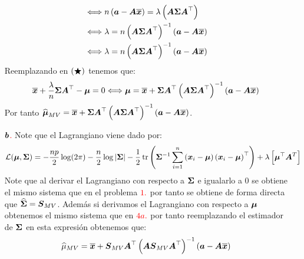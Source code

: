 \begin{itemize}
\begin{align*}
    &\ssi n\parcurvo{\bf{a} -\bf{A}
  \barra{\bf{x}}}=  \lambda\parcurvo{\bf{A}\bf{\Sigma}\bf{A}^\top}\\
    &\ssi \lambda = n\parcurvo{\bf{A}\bf{\Sigma}\bf{A}^\top}^{-1}\parcurvo{\bf{a} -\bf{A}
  \barra{\bf{x}}}\\
  &\ssi \lambda = n\parcurvo{\bf{A}\bf{\Sigma}\bf{A}^\top}^{-1}\parcurvo{\bf{a} -\bf{A}
  \barra{\bf{x}}}
\end{align*}
Reemplazando en $\estrella$ tenemos que:
$$
\barra{\bf{x}} + \dfrac{\lambda}{n}\bf{\Sigma}\bf{A}^\top - \bf{\mu} = 0 \ssi \bf{\mu} = \barra{\bf{x}} + \bf{\Sigma}\bf{A}^\top\parcurvo{\bf{A}\bf{\Sigma}\bf{A}^\top}^{-1}\parcurvo{\bf{a} -\bf{A}
  \barra{\bf{x}}}
$$
Por tanto $\gorro{\bf{\mu}}_{MV}=\barra{\bf{x}} + \bf{\Sigma}\bf{A}^\top\parcurvo{\bf{A}\bf{\Sigma}\bf{A}^\top}^{-1}\parcurvo{\bf{a} -\bf{A}
  \barra{\bf{x}}}$.
  \item[\textcolor{red}{$\bf{b}$.}] Note que el Lagrangiano viene dado por:
  $$
\mathcal{L}(\bf{\mu},\bf{\Sigma}) = -\frac{np}{2}\log(2\pi)-\frac{n}{2} \log |\boldsymbol{\Sigma}|-\frac{1}{2} \operatorname{tr}\left( \boldsymbol{\Sigma}^{-1}\suma \parcurvo{
\bf{x}_i - \bf{\mu}
}\parcurvo{
\bf{x}_i - \bf{\mu}
}^\top\right) + \lambda \parcerrado{
 \bf{\mu}^\top \bf{A}^T 
}
$$
Note que al derivar el Lagrangiano con respecto a $\bf{\Sigma}$ e igualarlo a 0 se obtiene el mismo sistema que en el problema $\textcolor{red}{1.}$ por tanto se obtiene de forma directa que $\gorro{\bf{\Sigma}} = \bf{S}_{MV}$. Además si derivamos el Lagrangiano con respecto a $\bf{\mu}$ obtenemos el mismo sistema que en $\textcolor{red}{4a.}$ por tanto reemplazando el estimador de $\bf{\Sigma}$ en esta expresión obtenemos que:
$$
\gorro{\mu}_{MV} = \barra{\bf{x}} + \bf{S}_{MV}\bf{A}^\top\parcurvo{\bf{A}\bf{S}_{MV}\bf{A}^\top}^{-1}\parcurvo{\bf{a} -\bf{A}
  \barra{\bf{x}}}
$$
\end{itemize}